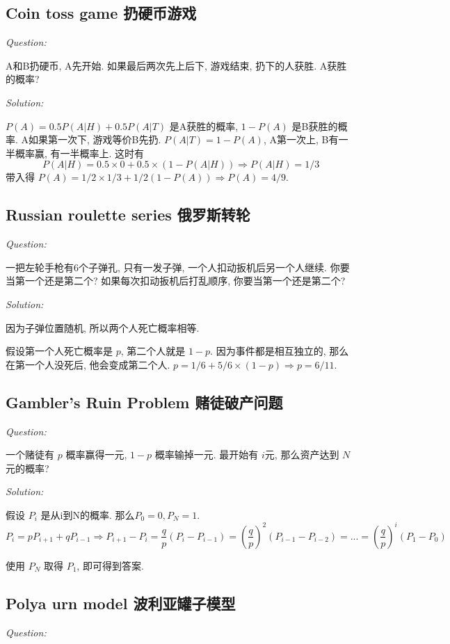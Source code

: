 \documentclass[12pt]{book}
\begin{document}
  \subsection{Coin toss game 扔硬币游戏}
\noindent \textit{Question:}

 A和B扔硬币, A先开始. 如果最后两次先上后下, 游戏结束, 扔下的人获胜. A获胜的概率?
 
 \noindent \textit{Solution:} 
 
 $P(A)=0.5P(A|H)+0.5P(A|T)$ 是A获胜的概率, $1-P(A)$ 是B获胜的概率. A如果第一次下, 游戏等价B先扔. $P(A|T)=1-P(A)$, A第一次上, B有一半概率赢, 有一半概率上. 这时有 $$P(A|H)=0.5\times 0 +0.5\times (1-P(A|H))\Rightarrow P(A|H)=1/3 $$
 带入得 $P(A)=1/2\times 1 /3 +1/2 (1-P(A))\Rightarrow P(A)=4/9 $.
 
   \subsection{Russian roulette series 俄罗斯转轮}
\noindent \textit{Question:}
 
 一把左轮手枪有6个子弹孔, 只有一发子弹, 一个人扣动扳机后另一个人继续. 你要当第一个还是第二个? 如果每次扣动扳机后打乱顺序, 你要当第一个还是第二个?
 
 \noindent \textit{Solution:} 
 
  因为子弹位置随机, 所以两个人死亡概率相等.


假设第一个人死亡概率是 $p$, 第二个人就是 $1-p$. 因为事件都是相互独立的, 那么在第一个人没死后, 他会变成第二个人. $p=1/6+5/6\times (1-p)\Rightarrow p =6/11$.
 
 
   \subsection{Gambler's Ruin Problem 赌徒破产问题}
\noindent \textit{Question:} 

 一个赌徒有 $p$ 概率赢得一元, $1-p$ 概率输掉一元. 最开始有 $i$元, 那么资产达到 $N$ 元的概率?
 
 \noindent \textit{Solution:} 
 
 假设 $P_i$ 是从i到N的概率. 那么$P_0=0, P_N=1$. 
 $$ P_i=p P_{i+1}+qP_{i-1} \Rightarrow  P_{i+1}-P_i=\frac{q}{p}(P_i-P_{i-1})=(\frac{q}{p})^2(P_{i-1}-P_{i-2})=...= (\frac{q}{p})^{i}(P_1-P_0) $$
 
 使用 $P_N$ 取得 $P_1$, 即可得到答案.

   \subsection{Polya urn model 波利亚罐子模型}
\noindent \textit{Question:} 
 
\end{document}
